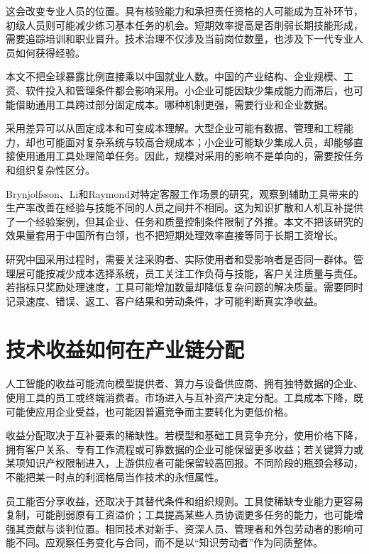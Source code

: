 \documentclass[UTF8,fontset=fandol,zihao=-4,oneside,openany]{ctexbook}
\begin{document}
这会改变专业人员的位置。具有核验能力和承担责任资格的人可能成为互补环节，初级人员则可能减少练习基本任务的机会。短期效率提高是否削弱长期技能形成，需要追踪培训和职业晋升。技术治理不仅涉及当前岗位数量，也涉及下一代专业人员如何获得经验。

本文不把全球暴露比例直接乘以中国就业人数。中国的产业结构、企业规模、工资、软件投入和管理条件都会影响采用。小企业可能因缺少集成能力而滞后，也可能借助通用工具跨过部分固定成本。哪种机制更强，需要行业和企业数据。

\label{arg:P192}
采用差异可以从固定成本和可变成本理解。大型企业可能有数据、管理和工程能力，却也可能面对复杂系统与较高合规成本；小企业可能缺少集成人员，却能够直接使用通用工具处理简单任务。因此，规模对采用的影响不是单向的，需要按任务和组织复杂性区分。

Brynjolfsson、Li和Raymond对特定客服工作场景的研究，观察到辅助工具带来的生产率改善在经验与技能不同的人员之间并不相同。这为知识扩散和人机互补提供了一个经验案例，但其企业、任务和质量控制条件限制了外推。本文不把该研究的效果量套用于中国所有白领，也不把短期处理效率直接等同于长期工资增长。\cite{AIWorkNBER}

研究中国采用过程时，需要关注采购者、实际使用者和受影响者是否同一群体。管理层可能按减少成本选择系统，员工关注工作负荷与技能，客户关注质量与责任。若指标只奖励处理速度，工具可能增加数量却降低复杂问题的解决质量。需要同时记录速度、错误、返工、客户结果和劳动条件，才可能判断真实净收益。

\section{技术收益如何在产业链分配}
人工智能的收益可能流向模型提供者、算力与设备供应商、拥有独特数据的企业、使用工具的员工或终端消费者。市场进入与互补资产决定分配。工具成本下降，既可能使应用企业受益，也可能因普遍竞争而主要转化为更低价格。

\label{arg:P193}
收益分配取决于互补要素的稀缺性。若模型和基础工具竞争充分，使用价格下降，拥有客户关系、专有工作流程或可靠数据的企业可能保留更多收益；若关键算力或某项知识产权限制进入，上游供应者可能保留较高回报。不同阶段的瓶颈会移动，不能把某一时点的利润格局当作技术的永恒属性。

员工能否分享收益，还取决于其替代条件和组织规则。工具使稀缺专业能力更容易复制，可能削弱原有工资溢价；工具提高某些人员协调更多任务的能力，也可能增强其贡献与谈判位置。相同技术对新手、资深人员、管理者和外包劳动者的影响可能不同。应观察任务变化与合同，而不是以“知识劳动者”作为同质整体。
\end{document}
